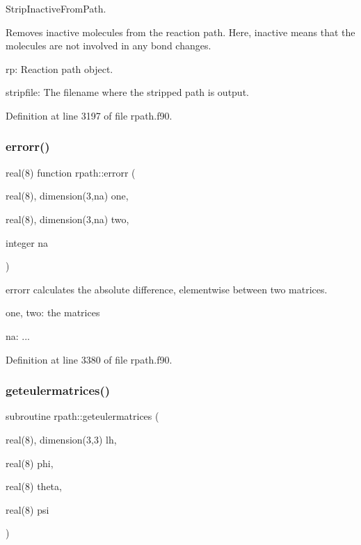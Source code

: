 Strip\+Inactive\+From\+Path. 

Removes inactive molecules from the reaction path. Here, inactive means that the molecules are not involved in any bond changes.


\begin{DoxyItemize}
\item rp\+: Reaction path object.
\item stripfile\+: The filename where the stripped path is output. 
\end{DoxyItemize}

Definition at line 3197 of file rpath.\+f90.

\mbox{\label{namespacerpath_a4c7410e4e6417ef235293315107537e8}} 
\subsubsection{\texorpdfstring{errorr()}{errorr()}}
{\footnotesize\ttfamily real(8) function rpath\+::errorr (\begin{DoxyParamCaption}\item[{real(8), dimension(3,na)}]{one,  }\item[{real(8), dimension(3,na)}]{two,  }\item[{integer}]{na }\end{DoxyParamCaption})}



errorr calculates the absolute difference, elementwise between two matrices. 


\begin{DoxyItemize}
\item one, two\+: the matrices
\item na\+: ... 
\end{DoxyItemize}

Definition at line 3380 of file rpath.\+f90.

\mbox{\label{namespacerpath_a37439f39e5934c023cbc1ce46a641de9}} 
\subsubsection{\texorpdfstring{geteulermatrices()}{geteulermatrices()}}
{\footnotesize\ttfamily subroutine rpath\+::geteulermatrices (\begin{DoxyParamCaption}\item[{real(8), dimension(3,3)}]{lh,  }\item[{real(8)}]{phi,  }\item[{real(8)}]{theta,  }\item[{real(8)}]{psi }\end{DoxyParamCaption})}



